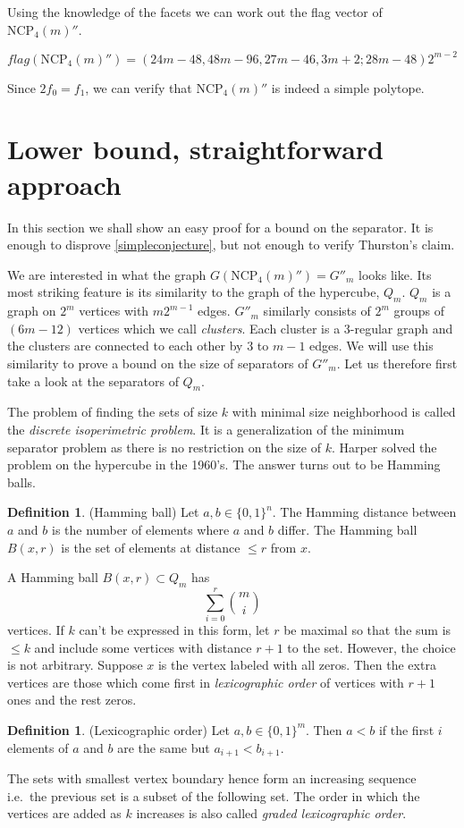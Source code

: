 \documentclass[a4paper,12pt]{book}
\theoremstyle{plain}
\theoremstyle{definition}
\newtheorem{definition}[theorem]{Definition}
\newcommand\NC{\textrm{NCP}}
\begin{document}
Using the knowledge of the facets we can work out the flag vector of 
$\NC_4(m)''$.

\begin{equation}
 flag(\NC_4(m)'') = (24m-48, 48m-96, 27m - 46, 3m+2; 28m -48)2^{m-2}
\end{equation}

Since $2f_0 = f_1$, we can verify that $\NC_4(m)''$ is indeed a simple 
polytope.

\section{Lower bound, straightforward approach}

In this section we shall show an easy proof for a bound on the separator. It
is enough to disprove \ref{simpleconjecture}, but not enough to verify Thurston's
claim.

We are interested in what the graph $G(\NC_4(m)'') = G''_m$ looks like. Its 
most striking feature is its similarity to the graph of the hypercube, $Q_m$. 
$Q_m$ is a graph on $2^m$ vertices with $m2^{m-1}$ edges. $G''_m$ 
similarly consists of $2^m$ groups of $(6m-12)$ vertices which we call 
\textit{clusters}. Each cluster is a 3-regular graph and the clusters are 
connected to each other by 3 to $m-1$ edges. We will use this similarity to 
prove a bound on the size of separators of $G''_m$. Let us therefore first take a 
look at the separators of $Q_m$.

The problem of finding the sets of size $k$ with minimal size neighborhood is 
called the \textit{discrete isoperimetric problem}. It is a generalization of 
the minimum separator problem as there is no restriction on the size of $k$. 
Harper \cite{Harp} solved the problem on the hypercube in the 1960's. The 
answer turns out to be Hamming balls.

\begin{definition}
 (Hamming ball) Let $a,b \in \{0,1\}^n$. The Hamming distance between $a$ and 
$b$ is the number of elements where $a$ and $b$ differ. The Hamming ball 
$B(x,r)$ is the set of elements at distance $\leq r$ from $x$.
\end{definition}

A Hamming ball $B(x,r) \subset Q_m$ has 
\begin{equation}
 \sum_{i=0}^r {m \choose i}
\end{equation}
vertices. If $k$ can't be expressed in this form, let $r$ be maximal so that 
the sum is $\leq k$ and include some vertices with distance $r+1$ to the set. 
However, the choice is not arbitrary. Suppose $x$ is the vertex labeled with 
all zeros. Then the extra vertices are those which come first in 
\textit{lexicographic order} of vertices with $r+1$ ones and the rest zeros.
\begin{definition}
 (Lexicographic order) Let $a,b \in \{0,1\}^m$. Then $a<b$ if the first $i$ 
elements of $a$ and $b$ are the same but $a_{i+1} < b_{i+1}$.
\end{definition}
The sets with smallest vertex boundary hence form an increasing sequence i.e.\ 
the previous set is a subset of the following set. The order in which the 
vertices are added as $k$ increases is also called \textit{graded lexicographic 
order}.
\end{document}
